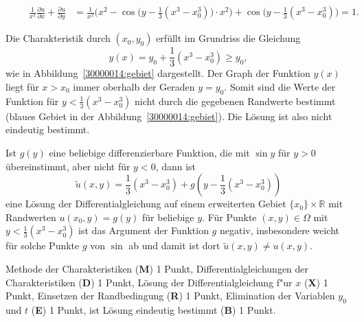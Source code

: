 \begin{loesung}
\begin{teilaufgaben}
\begin{align*}
\qquad
\frac1{x^2}
\frac{\partial u}{\partial x}
+
\frac{\partial u}{\partial y}
&=
\frac1{x^2}\biggl(x^2 -
\cos\bigl(y-{\textstyle\frac13}(x^3-x_0^3)\bigr)
\cdot x^2\biggr)
+
\cos\bigl(y-{\textstyle\frac13}(x^3-x_0^3)\bigr)
=1.
\end{align*}
\item
Die Charakteristik durch $(x_0,y_0)$ erfüllt im Grundriss die Gleichung
\[
y(x)
=
y_0 + {\textstyle\frac13}(x^3-x_0^3)
\ge
y_0,
\]
wie in Abbildung~\ref{30000014:gebiet} dargestellt.
Der Graph der Funktion $y(x)$ liegt für $x>x_0$ immer oberhalb der
Geraden $y=y_0$.
Somit sind die Werte der Funktion für $y < {\textstyle\frac13}(x^3-x_0^3)$
nicht durch die gegebenen Randwerte bestimmt (blaues Gebiet in der
Abbildung~\ref{30000014:gebiet}).
Die Lösung ist also nicht eindeutig bestimmt.
\qedhere
\end{teilaufgaben}
\end{loesung}

\begin{diskussion}
Ist $g(y)$ eine beliebige differenzierbare Funktion, die mit $\sin y$ 
für $y>0$ übereinstimmt, aber nicht für $y<0$, dann ist
\[
\tilde u(x,y) = {\textstyle\frac13}(x^3-x_0^3) + g(y-{\textstyle\frac13}(x^3-x_0^3))
\]
eine Lösung der Differentialgleichung auf einem erweiterten Gebiet
$\{x_0\}\times \mathbb R$ mit Randwerten $u(x_0,y)=g(y)$ für beliebige $y$.
Für Punkte $(x,y)\in\Omega$ mit $y<{\textstyle\frac13}(x^3-x_0^3)$
ist das Argument
der Funktion $g$ negativ, insbesondere weicht für solche Punkte $g$ von
$\sin$ ab und damit ist dort $\tilde u(x,y)\ne u(x,y)$.
\end{diskussion}

\begin{bewertung}
Methode der Charakteristiken ({\bf M}) 1 Punkt,
Differentialgleichungen der Charakteristiken ({\bf D}) 1 Punkt,
Lösung der Differentialgleichung f"ur $x$ ({\bf X}) 1 Punkt,
Einsetzen der Randbedingung ({\bf R}) 1 Punkt,
Elimination der Variablen $y_0$ und $t$ ({\bf E}) 1 Punkt,
ist Lösung eindeutig bestimmt ({\bf B}) 1 Punkt.
\end{bewertung}



